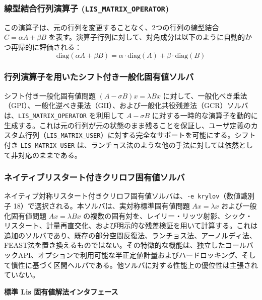 \documentclass[a4paper]{jarticle}
\begin{document}
{{\subsubsection{線型結合行列演算子 (\texttt{LIS\_MATRIX\_OPERATOR})}
この演算子は、元の行列を変更することなく、2つの行列の線型結合 $C = \alpha A + \beta B$ を表す。演算子行列に対して、対角成分は以下のように自動的かつ再帰的に評価される：
\[\mathrm{diag}(\alpha A + \beta B) = \alpha \cdot \mathrm{diag}(A) + \beta \cdot \mathrm{diag}(B)\]

\subsubsection{行列演算子を用いたシフト付き一般化固有値ソルバ}シフト付き一般化固有値問題 $(A - \sigma B)x = \lambda Bx$ に対して、一般化べき乗法（GPI）、一般化逆べき乗法（GII）、および一般化共役残差法（GCR）ソルバは、\texttt{LIS\_MATRIX\_OPERATOR} を利用して $A - \sigma B$ に対する一時的な演算子を動的に生成する。これは元の行列が元の状態のまま残ることを保証し、ユーザ定義のカスタム行列（\texttt{LIS\_MATRIX\_USER}）に対する完全なサポートを可能にする。シフト付き \texttt{LIS\_MATRIX\_USER} は、ランチョス法のような他の手法に対しては依然として非対応のままである。


\subsubsection{ネイティブリスタート付きクリロフ固有値ソルバ} \label{subsubsec:native-krylov}
ネイティブ対称リスタート付きクリロフ固有値ソルバは、\verb|-e krylov|（数値識別子 18）で選択される。本ソルバは、実対称標準固有値問題 $Ax=\lambda x$ および一般化固有値問題 $Ax=\lambda Bx$ の複数の固有対を、レイリー・リッツ射影、シック・リスタート、計量再直交化、および明示的な残差検証を用いて計算する。これは追加のソルバであり、既存の部分空間反復法、ランチョス法、アーノルディ法、FEAST法を置き換えるものではない。その特徴的な機能は、独立したコールバックAPI、オプションで利用可能な半正定値計量およびハードロッキング、そして慣性に基づく区間ヘルパである。他ソルバに対する性能上の優位性は主張されていない。

\noindent
{\bf 標準 Lis 固有値解法インタフェース}

}}
\end{document}
